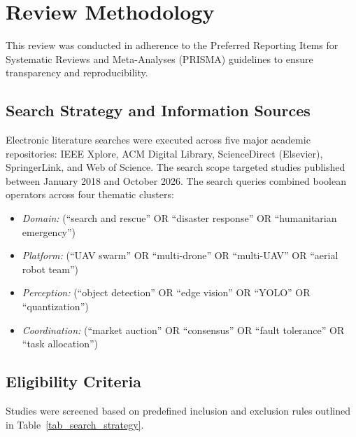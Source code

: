 \documentclass[journal]{IEEEtran}
\begin{document}
\section{Review Methodology}
This review was conducted in adherence to the Preferred Reporting Items for Systematic Reviews and Meta-Analyses (PRISMA) guidelines to ensure transparency and reproducibility.

\subsection{Search Strategy and Information Sources}
Electronic literature searches were executed across five major academic repositories: IEEE Xplore, ACM Digital Library, ScienceDirect (Elsevier), SpringerLink, and Web of Science. The search scope targeted studies published between January 2018 and October 2026. The search queries combined boolean operators across four thematic clusters:
\begin{itemize}
    \item \textit{Domain:} (``search and rescue'' OR ``disaster response'' OR ``humanitarian emergency'')
    \item \textit{Platform:} (``UAV swarm'' OR ``multi-drone'' OR ``multi-UAV'' OR ``aerial robot team'')
    \item \textit{Perception:} (``object detection'' OR ``edge vision'' OR ``YOLO'' OR ``quantization'')
    \item \textit{Coordination:} (``market auction'' OR ``consensus'' OR ``fault tolerance'' OR ``task allocation'')
\end{itemize}

\subsection{Eligibility Criteria}
Studies were screened based on predefined inclusion and exclusion rules outlined in Table~\ref{tab_search_strategy}.
\end{document}
